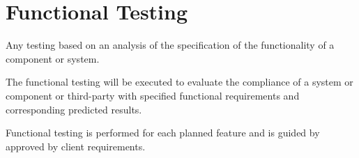 \section{Functional Testing}
\label{sec:Functional Testing}

Any testing based on an analysis of the specification of the functionality of a component or system.

The functional testing will be executed to evaluate the compliance of a system or component or third-party with specified functional requirements and corresponding predicted results.

Functional testing is performed for each planned feature and is guided by approved by client requirements.